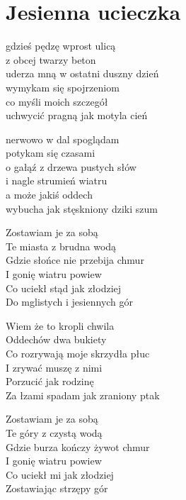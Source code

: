 \section{Jesienna ucieczka}
\begin{text}
gdzieś pędzę wprost ulicą\\
z obcej twarzy beton\\
uderza mną w ostatni duszny dzień\\
wymykam się spojrzeniom\\
co myśli moich szczegół\\
uchwycić pragną jak motyla cień

nerwowo w dal spoglądam\\
potykam się czasami\\
o gałąź z drzewa pustych słów\\
i nagle strumień wiatru\\
a może jakiś oddech\\
wybucha jak stęskniony dziki szum

\vin Zostawiam je za sobą\\
\vin Te miasta z brudna wodą\\
\vin Gdzie słońce nie przebija chmur\\
\vin I gonię wiatru powiew\\
\vin Co uciekł stąd jak złodziej\\
\vin Do mglistych i jesiennych gór

Wiem że to kropli chwila\\
Oddechów dwa bukiety\\
Co rozrywają moje skrzydła płuc\\
I zrywać muszę z nimi\\
Porzucić jak rodzinę\\
Za łzami spadam jak zraniony ptak

\vin Zostawiam je za sobą\\
\vin Te góry z czystą wodą\\
\vin Gdzie burza kończy żywot chmur\\
\vin I gonię wiatru powiew\\
\vin Co uciekł mi jak złodziej\\
\vin Zostawiając strzępy gór
\end{text}